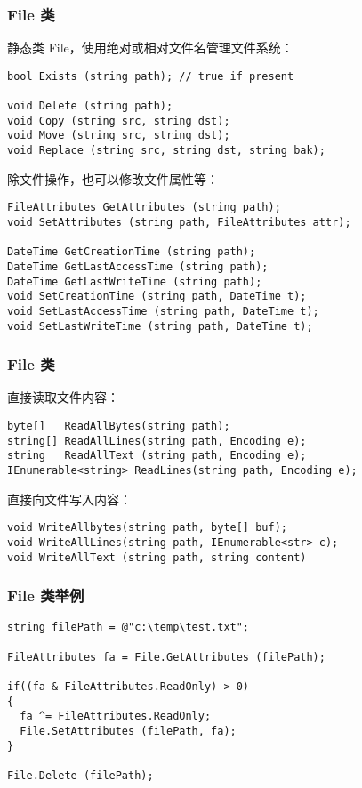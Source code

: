 \begin{frame}[fragile]
\frametitle{File 类}
静态类 File，使用绝对或相对文件名管理文件系统：
\begin{lstlisting}
bool Exists (string path); // true if present

void Delete (string path);
void Copy (string src, string dst);
void Move (string src, string dst);
void Replace (string src, string dst, string bak);
\end{lstlisting}
除文件操作，也可以修改文件属性等：
\begin{lstlisting}
FileAttributes GetAttributes (string path);
void SetAttributes (string path, FileAttributes attr);

DateTime GetCreationTime (string path); 
DateTime GetLastAccessTime (string path);
DateTime GetLastWriteTime (string path);
void SetCreationTime (string path, DateTime t);
void SetLastAccessTime (string path, DateTime t);
void SetLastWriteTime (string path, DateTime t);
\end{lstlisting}
\end{frame}

\begin{frame}[fragile]
\frametitle{File 类}
直接读取文件内容：
\begin{lstlisting}
byte[]   ReadAllBytes(string path);
string[] ReadAllLines(string path, Encoding e);
string   ReadAllText (string path, Encoding e);
IEnumerable<string> ReadLines(string path, Encoding e);
\end{lstlisting}
直接向文件写入内容：
\begin{lstlisting}
void WriteAllbytes(string path, byte[] buf);
void WriteAllLines(string path, IEnumerable<str> c);
void WriteAllText (string path, string content)
\end{lstlisting}
\end{frame}

\begin{frame}[fragile]
\frametitle{File 类举例}

\begin{lstlisting}
string filePath = @"c:\temp\test.txt";

FileAttributes fa = File.GetAttributes (filePath);

if((fa & FileAttributes.ReadOnly) > 0)
{ 
  fa ^= FileAttributes.ReadOnly;
  File.SetAttributes (filePath, fa); 
}

File.Delete (filePath);
\end{lstlisting}
\end{frame}


